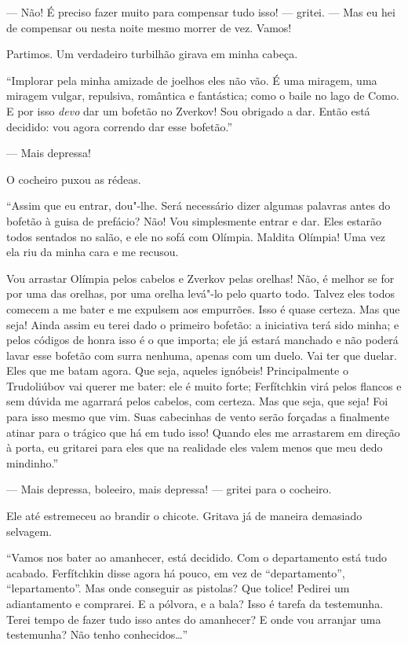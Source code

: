 --- Não! É preciso fazer muito para compensar tudo isso! --- gritei. --- Mas
eu hei de compensar ou nesta noite mesmo morrer de vez. Vamos!

Partimos. Um verdadeiro turbilhão girava em minha cabeça.

``Implorar pela minha amizade de joelhos eles não vão. É uma miragem, uma
miragem vulgar, repulsiva, romântica e fantástica; como o baile no lago
de Como. E por isso \textit{devo} dar um bofetão no Zverkov! Sou
obrigado a dar. Então está decidido: vou agora correndo dar esse
bofetão.''

--- Mais depressa!

O cocheiro puxou as rédeas.

``Assim que eu entrar, dou"-lhe. Será necessário dizer algumas palavras
antes do bofetão à guisa de prefácio? Não! Vou simplesmente entrar e dar.
Eles estarão todos sentados no salão, e ele no sofá com Olímpia.
Maldita Olímpia! Uma vez ela riu da minha cara e me recusou.

Vou arrastar Olímpia pelos cabelos e Zverkov pelas orelhas! Não, é
melhor se for por uma das orelhas, por uma orelha levá"-lo pelo quarto
todo. Talvez eles todos comecem a me bater e me expulsem aos empurrões.
Isso é quase certeza. Mas que seja! Ainda assim eu terei dado o
primeiro bofetão: a iniciativa terá sido minha; e pelos códigos de
honra isso é o que importa; ele já estará manchado e não poderá lavar
esse bofetão com surra nenhuma, apenas com um duelo. Vai ter que
duelar. Eles que me batam agora. Que seja, aqueles ignóbeis!
Principalmente o Trudoliúbov vai querer me bater: ele é muito forte;
Ferfítchkin virá pelos flancos e sem dúvida me agarrará pelos cabelos,
com certeza. Mas que seja, que seja! Foi para isso mesmo que vim. Suas
cabecinhas de vento serão forçadas a finalmente atinar para o trágico
que há em tudo isso! Quando eles me arrastarem em direção à porta, eu
gritarei para eles que na realidade eles valem menos que meu dedo
mindinho.''

--- Mais depressa, boleeiro, mais depressa! --- gritei para o cocheiro.

Ele até estremeceu ao brandir o chicote. Gritava já de maneira demasiado
selvagem.

``Vamos nos bater ao amanhecer, está decidido. Com o departamento está
tudo acabado. Ferfítchkin disse agora há pouco, em vez de
``departamento'', ``lepartamento''. Mas onde conseguir as pistolas? Que
tolice! Pedirei um adiantamento e comprarei. E a pólvora, e a bala?
Isso é tarefa da testemunha. Terei tempo de fazer tudo isso antes do
amanhecer? E onde vou arranjar uma testemunha? Não tenho conhecidos\ldots{}''

